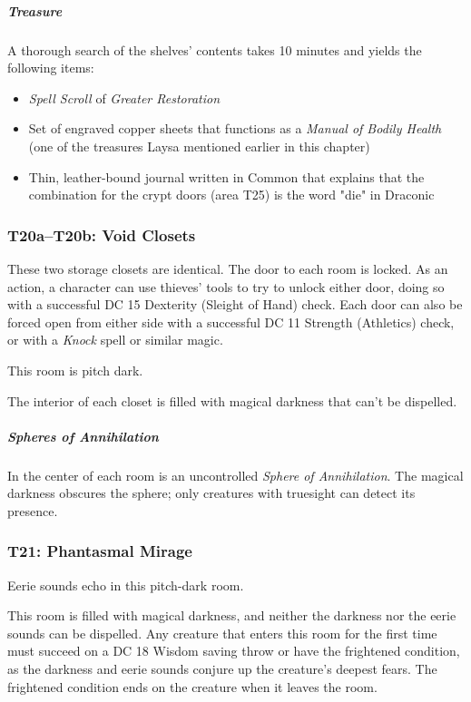 \documentclass[10pt,a4paper,twoside,bg=print,twocolumn,openany,nodeprecatedcode]{dndbook}
\begin{document}
\subparagraph{Treasure}
A thorough search of the shelves' contents takes 10 minutes and yields the following items:


\begin{itemize}
\item \textit{Spell Scroll} of \textit{Greater Restoration}
\item Set of engraved copper sheets that functions as a \textit{Manual of Bodily Health} (one of the treasures Laysa mentioned earlier in this chapter)
\item Thin, leather-bound journal written in Common that explains that the combination for the crypt doors (area T25) is the word "die" in Draconic
\end{itemize}

\subsubsection{T20a–T20b: Void Closets}
These two storage closets are identical. The door to each room is locked. As an action, a character can use thieves' tools to try to unlock either door, doing so with a successful DC 15 Dexterity (Sleight of Hand) check. Each door can also be forced open from either side with a successful DC 11 Strength (Athletics) check, or with a \textit{Knock} spell or similar magic.

\begin{DndReadAloud}{}
This room is pitch dark.

\end{DndReadAloud}

The interior of each closet is filled with magical darkness that can't be dispelled.

\subparagraph{Spheres of Annihilation}
In the center of each room is an uncontrolled \textit{Sphere of Annihilation}. The magical darkness obscures the sphere; only creatures with truesight can detect its presence.

\subsubsection{T21: Phantasmal Mirage}
\begin{DndReadAloud}{}
Eerie sounds echo in this pitch-dark room.

\end{DndReadAloud}

This room is filled with magical darkness, and neither the darkness nor the eerie sounds can be dispelled. Any creature that enters this room for the first time must succeed on a DC 18 Wisdom saving throw or have the frightened condition, as the darkness and eerie sounds conjure up the creature's deepest fears. The frightened condition ends on the creature when it leaves the room.
\end{document}
